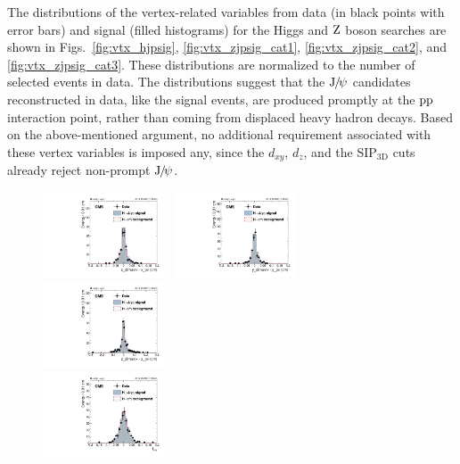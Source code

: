 		The distributions of the vertex-related variables from data (in black points with error bars) and signal (filled histograms) for the Higgs and $\mathrm{Z}$ boson searches are shown in Figs.~\ref{fig:vtx_hjpsig}, \ref{fig:vtx_zjpsig_cat1}, \ref{fig:vtx_zjpsig_cat2}, and \ref{fig:vtx_zjpsig_cat3}. These distributions are normalized to the number of selected events in data. The distributions suggest that the ${\mathrm{J}\hspace{-.08em}/\hspace{-.14em}\psi}$ candidates reconstructed in data, like the signal events, are produced promptly at the $\mathrm{p}\mathrm{p}$ interaction point, rather than coming from displaced heavy hadron decays.
		Based on the above-mentioned argument, no additional requirement associated with these vertex variables is imposed any, since the $d_{xy}$, $d_{z}$, and the SIP$_{\text{3D}}$ cuts already reject non-prompt ${\mathrm{J}\hspace{-.08em}/\hspace{-.14em}\psi}$.
		
		\begin{figure}[p]
		  \centering
		  \includegraphics[width=0.32\textwidth]{Fig/Final_NoPreliminary/HJpsiG/VtxDispX_Norm_Inclusive}~
		  \includegraphics[width=0.32\textwidth]{Fig/Final_NoPreliminary/HJpsiG/VtxDispY_Norm_Inclusive}~
		  \includegraphics[width=0.32\textwidth]{Fig/Final_NoPreliminary/HJpsiG/VtxDispZ_Norm_Inclusive}\\
		  \includegraphics[width=0.32\textwidth]{Fig/Final_NoPreliminary/HJpsiG/Lxy_Norm_Inclusive}~

\end{figure}
